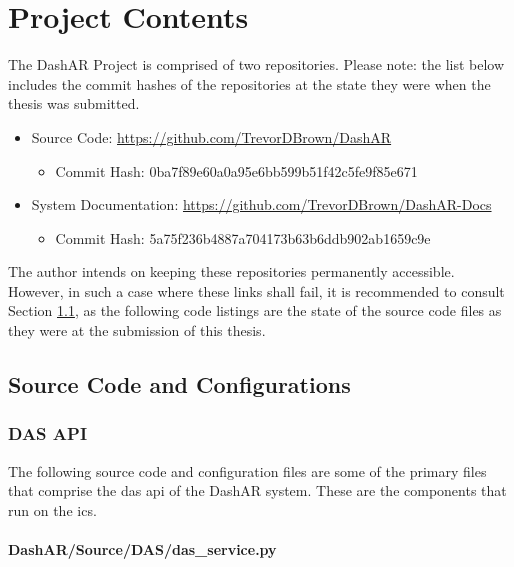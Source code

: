 \chapter{Project Contents}
\label{appendix:project}

    \par The DashAR Project is comprised of two repositories. Please note: the list below includes the commit hashes of the repositories at the state they were when the thesis was submitted.

    \begin{itemize}
        \item Source Code: \url{https://github.com/TrevorDBrown/DashAR}
        \begin{itemize}
            \item Commit Hash: 0ba7f89e60a0a95e6bb599b51f42c5fe9f85e671
        \end{itemize}
        \item System Documentation: \url{https://github.com/TrevorDBrown/DashAR-Docs} \
        \begin{itemize}
            \item Commit Hash: 5a75f236b4887a704173b63b6ddb902ab1659c9e
        \end{itemize}
    \end{itemize}

    \par The author intends on keeping these repositories permanently accessible. However, in such a case where these links shall fail, it is recommended to consult Section \ref{sec:sourcecode}, as the following code listings are the state of the source code files as they were at the submission of this thesis.

    \section{Source Code and Configurations}
        \label{sec:sourcecode}
        \subsection{DAS API}
            \par The following source code and configuration files are some of the primary files that comprise the \gls{das} \gls{api} of the DashAR system. These are the components that run on the \gls{ics}.

            \newpage

            \subsubsection{DashAR/Source/DAS/das\_service.py}
                \label{scl:dasservicepy}
                \begin{singlespacecode}
                    
                \end{singlespacecode}

